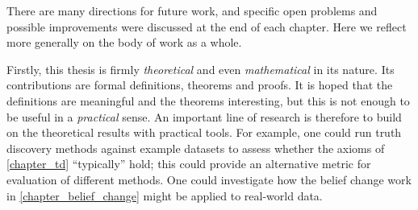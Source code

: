 There are many directions for future work, and specific open problems and
possible improvements were discussed at the end of each chapter. Here we
reflect more generally on the body of work as a whole.

Firstly, this thesis is firmly \emph{theoretical} and even \emph{mathematical}
in its nature. Its contributions are formal definitions, theorems and proofs.
It is hoped that the definitions are meaningful and the theorems interesting,
but this is not enough to be useful in a \emph{practical} sense. An important
line of research is therefore to build on the theoretical results with
practical tools. For example, one could run truth discovery methods against
example datasets to assess whether the axioms of \cref{chapter_td}
``typically'' hold; this could provide an alternative metric for evaluation of
different methods. One could investigate how the belief change work in
\cref{chapter_belief_change} might be applied to real-world data.
